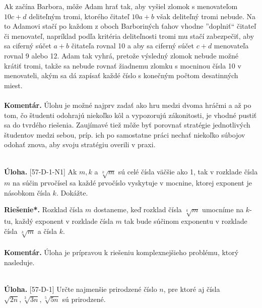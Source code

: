 \documentclass[11pt,a4paper,oneside,final]{book}
\newcommand{\kom}{\textbf{Komentár.} }
\newcommand{\ul}{\textbf{Úloha.} }
\newcommand{\rieh}{\textbf{Riešenie*.} }
\begin{document}
Ak začína Barbora, môže Adam hrať tak, aby vyšiel zlomok s menovateľom $10c+d$ deliteľným tromi, ktorého čitateľ $10a + b$ však deliteľný tromi nebude. Na to Adamovi stačí po každom z oboch Barboriných ťahov vhodne ”doplniť“ čitateľ či menovateľ, napríklad podľa kritéria deliteľnosti tromi mu stačí zabezpečiť, aby sa ciferný súčet $a+b$ čitateľa rovnal 10 a aby sa ciferný súčet $c+d$ menovateľa rovnal 9 alebo 12. Adam tak vyhrá, pretože výsledný zlomok nebude možné krátiť tromi, takže sa nebude rovnať žiadnemu zlomku s mocninou čísla 10 v menovateli, akým sa dá zapísať každé číslo s konečným počtom desatinných miest.\\
\\
\kom Úlohu je možné najprv zadať ako hru medzi dvoma hráčmi a až po tom, čo študenti odohrajú niekoľko kôl a vypozorujú zákonitosti, je vhodné pustiť sa do tvrdého riešenia. Zaujímavé tiež môže byť porovnať stratégie jednotlivých študentov medzi sebou, príp. ich po samostatne práci nechať niekoľko súbojov odohať znova, aby svoju stratégiu overili v praxi.\\
\\
\begin{tcolorbox}[breakable,notitle,boxrule=0pt,colback=light-gray,colframe=light-gray]\ul [57-D-1-N1] Ak $m, k$ a $\sqrt[k]{m}$ sú celé čísla väčšie ako 1, tak v rozklade čísla $m$ na súčin prvočísel sa každé prvočíslo vyskytuje v mocnine, ktorej exponent je násobkom čísla $k$. Dokážte.

\end{tcolorbox}

\rieh Rozklad čísla $m$ dostaneme, keď rozklad čísla $\sqrt[k]{m}$ umocníme na $k$-tu, každý exponent v rozklade čísla $m$ tak bude súčinom exponentu v rozklade čísla $\sqrt[k]{m}$ a čísla $k$. \\ %
\\
\kom Úloha je prípravou k riešeniu komplexnejšieho problému, ktorý nasleduje.\\
\\
\begin{tcolorbox}[breakable,notitle,boxrule=0pt,colback=light-gray,colframe=light-gray]\ul [57-D-1]
Určte najmenšie prirodzené číslo $n$, pre ktoré aj čísla
$\sqrt{2n}, \sqrt[3]{3n}, \sqrt[5]{5n}$ sú prirodzené.

\end{tcolorbox}
\end{document}
